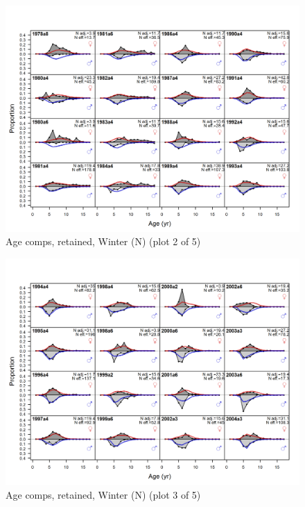 \documentclass[12pt,]{article}
\begin{document}
\begin{figure}
\centering
\includegraphics{r4ss/plots_mod1/comp_agefit_flt1mkt2_page2.png}
\caption{Age comps, retained, Winter (N) (plot 2 of 5)
\label{fig:age_fits}}
\end{figure}

\begin{figure}
\centering
\includegraphics{r4ss/plots_mod1/comp_agefit_flt1mkt2_page3.png}
\caption{Age comps, retained, Winter (N) (plot 3 of 5)
\label{fig:age_fits}}
\end{figure}
\end{document}
